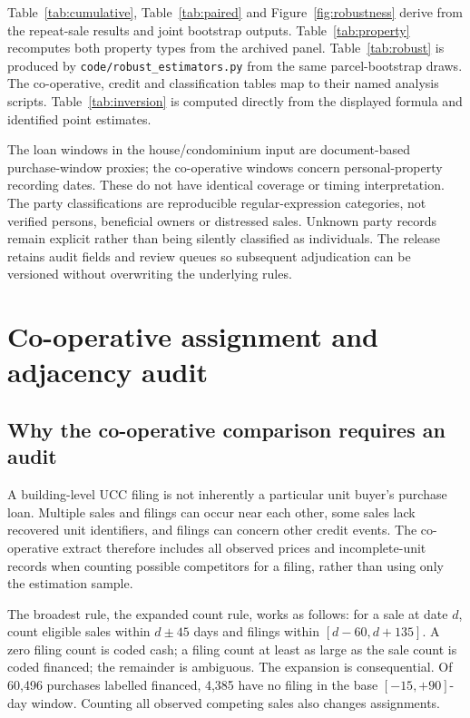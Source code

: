 \documentclass[12pt]{article}
\begin{document}
Table~\ref{tab:cumulative}, Table~\ref{tab:paired} and Figure~\ref{fig:robustness} derive from the repeat-sale results and joint bootstrap outputs. Table~\ref{tab:property} recomputes both property types from the archived panel. Table~\ref{tab:robust} is produced by \texttt{code/robust\_estimators.py} from the same parcel-bootstrap draws. The co-operative, credit and classification tables map to their named analysis scripts. Table~\ref{tab:inversion} is computed directly from the displayed formula and identified point estimates.

The loan windows in the house/condominium input are document-based purchase-window proxies; the co-operative windows concern personal-property recording dates. These do not have identical coverage or timing interpretation. The party classifications are reproducible regular-expression categories, not verified persons, beneficial owners or distressed sales. Unknown party records remain explicit rather than being silently classified as individuals. The release retains audit fields and review queues so subsequent adjudication can be versioned without overwriting the underlying rules.


\section{Co-operative assignment and adjacency audit}\label{sec:coopaudit}
\subsection{Why the co-operative comparison requires an audit}
A building-level UCC filing is not inherently a particular unit buyer's purchase loan. Multiple sales and filings can occur near each other, some sales lack recovered unit identifiers, and filings can concern other credit events. The co-operative extract therefore includes all observed prices and incomplete-unit records when counting possible competitors for a filing, rather than using only the estimation sample.

The broadest rule, the expanded count rule, works as follows: for a sale at date $d$, count eligible sales within $d\pm45$ days and filings within $[d-60,d+135]$. A zero filing count is coded cash; a filing count at least as large as the sale count is coded financed; the remainder is ambiguous. The expansion is consequential. Of 60,496 purchases labelled financed, 4,385 have no filing in the base $[-15,+90]$-day window. Counting all observed competing sales also changes assignments.
\end{document}
